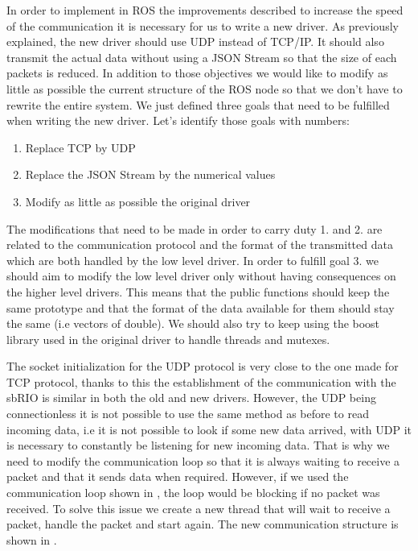 In order to implement in ROS the improvements described to increase the speed of the communication it is necessary for us to write a new driver. As previously explained, the new driver should use UDP instead of TCP/IP. It should also transmit the actual data without using a \gls{JSON} Stream so that the size of each packets is reduced. In addition to those objectives we would like to modify as little as possible the current structure of the ROS node so that we don't have to rewrite the entire system. 
We just defined three goals that need to be fulfilled when writing the new driver. Let's identify those goals with numbers:
\begin{enumerate}
	\item Replace TCP by UDP
	\item Replace the \gls{JSON} Stream by the numerical values
	\item Modify as little as possible the original driver
\end{enumerate}

The modifications that need to be made in order to carry duty 1. and 2. are related to the communication protocol and the format of the transmitted data which are both handled by the low level driver. In order to fulfill goal 3. we should aim to modify the low level driver only without having consequences on the higher level drivers. This means that the public functions should keep the same prototype and that the format of the data available for them should stay the same (i.e vectors of double). We should also try to keep using the boost library used in the original driver to handle threads and mutexes.

The socket initialization for the UDP protocol is very close to the one made for TCP protocol, thanks to this the establishment of the communication with the sbRIO is similar in both the old and new drivers. However, the UDP being connectionless it is not possible to use the same method as before to read incoming data, i.e it is not possible to look if some new data arrived, with UDP it is necessary to constantly be listening for new incoming data. That is why we need to modify the communication loop so that it is always waiting to receive a packet and that it sends data when required. However, if we used the communication loop shown in , the loop would be blocking if no packet was received. To solve this issue we create a new thread that will wait to receive a packet, handle the packet and start again. The new communication structure is shown in .

